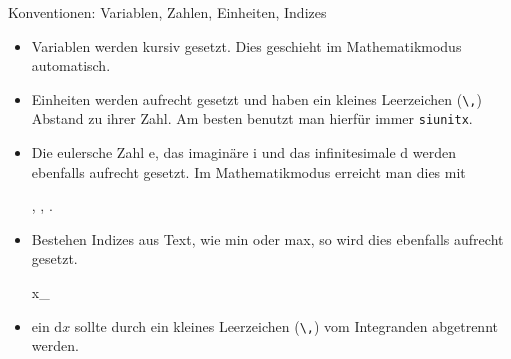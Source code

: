 \begin{frame}[fragile]{Konventionen: Variablen, Zahlen, Einheiten, Indizes}
  \begin{itemize}
    \item Variablen werden kursiv gesetzt.
      Dies geschieht im Mathematikmodus automatisch.
    \item Einheiten werden aufrecht gesetzt und haben ein kleines Leerzeichen (\verb+\,+) Abstand zu ihrer Zahl.
      Am besten benutzt man hierfür immer \texttt{siunitx}.
    \item Die eulersche Zahl $\mathrm{e}$, das imaginäre $\mathrm{i}$ und das infinitesimale $\mathrm{d}$ werden ebenfalls aufrecht gesetzt.
      Im Mathematikmodus erreicht man dies mit
      \begin{lstverbatim}
      , , .
      \end{lstverbatim}
    \item Bestehen Indizes aus Text, wie min oder max, so wird dies ebenfalls aufrecht gesetzt.
      \begin{lstverbatim}
      x_
      \end{lstverbatim}
    \item ein $\mathrm{d}x$ sollte durch ein kleines Leerzeichen (\verb+\,+) vom Integranden abgetrennt werden.
  \end{itemize}
\end{frame}
